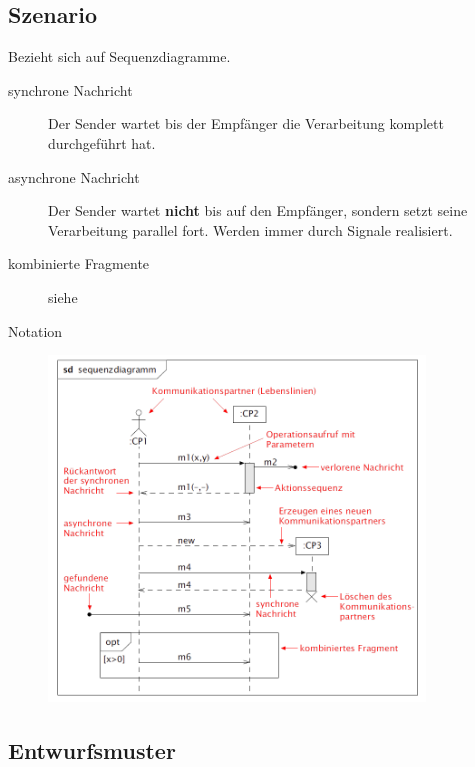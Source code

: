 \subsection{Szenario }
  Bezieht sich auf Sequenzdiagramme.
  \begin{description}
    \item[synchrone Nachricht]
      Der Sender wartet bis der Empfänger die Verarbeitung komplett durchgeführt hat.
    \item[asynchrone Nachricht]
      Der Sender wartet \textbf{nicht} bis auf den Empfänger, sondern setzt seine Verarbeitung parallel fort. Werden immer durch Signale realisiert.
    \item[kombinierte Fragmente]
      siehe 
    \item[Notation]
      \parbox{15cm}{\includegraphics[width=10cm]{./images/Notation_Sequanzdia.png}}
  \end{description}
  
\subsection{Entwurfsmuster }
